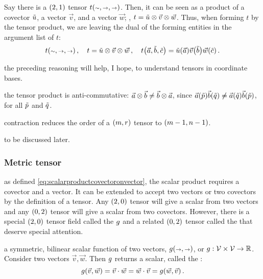  Say there is a $\torder 21$ tensor $t\vat{\cslot,\vslot,\vslot}$. Then, it can be seen as a product of a covector $\tilde{u}$, a vector $\vec v$, and a vector $\vec w$; \ie, $t = \tilde{u}\otimes\vec v\otimes\vec w$. Thus, when forming $t$ by the tensor product, we are leaving the dual of the forming entities in the argument list of $t$:
%
\begin{equation*}
  t\vat{\cslot,\vslot,\vslot}         \,,\quad 
  t = \cov u\tprod\vec v\tprod\vec w  \,,\quad
  t\vat{\vec a,\cov b,\cov c} = \cov u\vat{\vec a}\vec v\vat{\cov b}\vec w\vat{\cov c}\,.
\end{equation*}

 the preceding reasoning will help, I hope, to understand tensors in coordinate bases.

 the tensor product is anti-commutative: $\vec a\otimes\vec b \neq \vec b\otimes\vec a$, since $\vec a\vat{\cov p}\vec b\vat{\cov q}\neq\vec a\vat{\cov q}\vec b\vat{\cov p}$, for all $\tilde{p}$ and $\tilde{q}$.

 contraction reduces the order of a $\torder mr$ tensor to $\torder{m - 1}{n - 1}$.

 to be discussed later.


\subsubsection{Metric tensor}
%
 as defined \cref{eq:scalarproductcovectoronvector}, the scalar product requires a covector and a vector. It can be extended to accept two vectors or two covectors by the definition of a tensor. Any $\torder 20$ tensor will give a scalar from two vectors and any $\torder 02$ tensor will give a scalar from two covectors. However, there is a special $\torder 20$ tensor field called the  $g$ and a related $\torder 02$ tensor called the  that deserve special attention.

 a symmetric, bilinear scalar function of two vectors, $\metric\vat{\vslot,\vslot}$, or ${g}:{\mathcal{V}\times\mathcal{V}}\to{\mathbb{R}}$. Consider two vectors $\vec v,\vec w$. Then $g$ returns a scalar, called the :
%
\begin{equation}\label{eq:metricdotproduct}
  \metric\vat{\vec v, \vec w} = \vec v\iprod\vec w 
                              = \vec w\iprod\vec v 
                              = \metric\vat{\vec w,\vec v}\,.
\end{equation}

